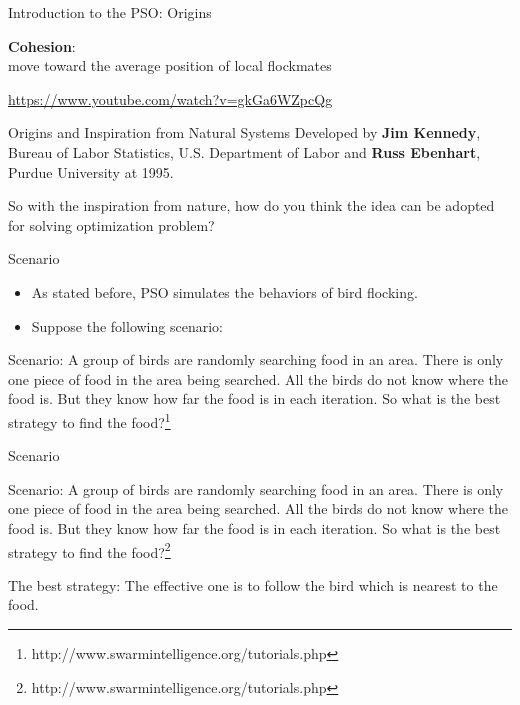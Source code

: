 \documentclass[pdflatex,compress,mathserif]{beamer}
\begin{document}
\begin{frame}{Introduction to the PSO: Origins}
\begin{multicols}{3}
		\scriptsize{\textbf{Cohesion}:\\
			move toward the average position of local flockmates}
		\vfill\null
	\end{multicols}
	\centering \href{https://www.youtube.com/watch?v=gkGa6WZpcQg}{\footnotesize{https://www.youtube.com/watch?v=gkGa6WZpcQg}}
\end{frame}

\begin{frame}{Origins and Inspiration from Natural Systems}
	Developed by \textbf{Jim Kennedy}, Bureau of Labor Statistics, U.S. Department of Labor and \textbf{Russ Ebenhart}, Purdue University at 1995.
\end{frame}

\begin{frame}
	\Large{So with the inspiration from nature, how do you think the idea can be adopted for solving optimization problem?}
\end{frame}

\begin{frame}{Scenario}
	\begin{itemize}
		\item As stated before, PSO simulates the behaviors of bird flocking.
		\item Suppose the following scenario:
	\end{itemize}
	\begin{exampleblock}{Scenario:}
		A group of birds are randomly searching food in an area. There is only one piece of food in the area being searched. All the birds do not know where the food is. But they know how far the food is in each iteration. So what is the best strategy to find the food?\footnote{http://www.swarmintelligence.org/tutorials.php}
	\end{exampleblock}
\end{frame}

\begin{frame}{Scenario}
	\begin{exampleblock}{Scenario:}
		A group of birds are randomly searching food in an area. There is only one piece of food in the area being searched. All the birds do not know where the food is. But they know how far the food is in each iteration. So what is the best strategy to find the food?\footnote{http://www.swarmintelligence.org/tutorials.php}
	\end{exampleblock}
	\begin{alertblock}{The best strategy:}
		The effective one is to follow the bird which is nearest to the food.
	\end{alertblock}
\end{frame}
\end{document}
